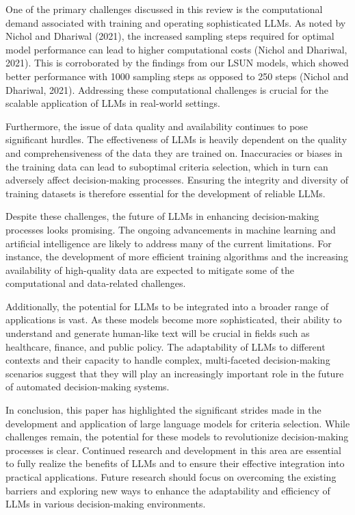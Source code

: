 \documentclass[conference]{IEEEtran}
\begin{document}
One of the primary challenges discussed in this review is the computational demand associated with training and operating sophisticated LLMs. As noted by Nichol and Dhariwal (2021), the increased sampling steps required for optimal model performance can lead to higher computational costs (Nichol and Dhariwal, 2021). This is corroborated by the findings from our LSUN models, which showed better performance with 1000 sampling steps as opposed to 250 steps (Nichol and Dhariwal, 2021). Addressing these computational challenges is crucial for the scalable application of LLMs in real-world settings.

Furthermore, the issue of data quality and availability continues to pose significant hurdles. The effectiveness of LLMs is heavily dependent on the quality and comprehensiveness of the data they are trained on. Inaccuracies or biases in the training data can lead to suboptimal criteria selection, which in turn can adversely affect decision-making processes. Ensuring the integrity and diversity of training datasets is therefore essential for the development of reliable LLMs.

Despite these challenges, the future of LLMs in enhancing decision-making processes looks promising. The ongoing advancements in machine learning and artificial intelligence are likely to address many of the current limitations. For instance, the development of more efficient training algorithms and the increasing availability of high-quality data are expected to mitigate some of the computational and data-related challenges.

Additionally, the potential for LLMs to be integrated into a broader range of applications is vast. As these models become more sophisticated, their ability to understand and generate human-like text will be crucial in fields such as healthcare, finance, and public policy. The adaptability of LLMs to different contexts and their capacity to handle complex, multi-faceted decision-making scenarios suggest that they will play an increasingly important role in the future of automated decision-making systems.

In conclusion, this paper has highlighted the significant strides made in the development and application of large language models for criteria selection. While challenges remain, the potential for these models to revolutionize decision-making processes is clear. Continued research and development in this area are essential to fully realize the benefits of LLMs and to ensure their effective integration into practical applications. Future research should focus on overcoming the existing barriers and exploring new ways to enhance the adaptability and efficiency of LLMs in various decision-making environments.

            
            

            
\end{document}

